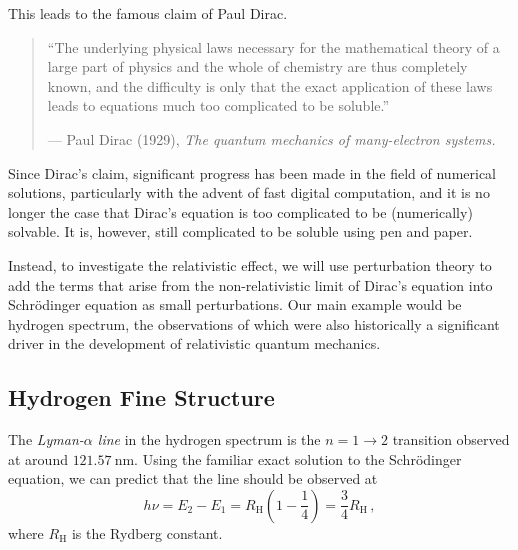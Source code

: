 \documentclass{article}
\theoremstyle{plain}\theoremheaderfont{\normalfont\itshape}\theorembodyfont{\rmfamily}\theoremseparator{.}\newtheorem*{rem}{Remark}\newtheorem*{ex}{Example}\newtheorem*{proof}{Proof}\newtheorem*{altp}{Alternative proof}
\theoremstyle{plain}\theoremheaderfont{\normalfont\bfseries}\theorembodyfont{\rmfamily}\theoremseparator{.}\newtheorem{thm}{Theorem}[section]\newtheorem{lem}[thm]{Lemma}\newtheorem{prop}[thm]{Proposition}\newtheorem*{cor}{Corollary}\newtheorem{defn}[thm]{Definition}\newtheorem{clm}[thm]{Claim}\newtheorem{clminproof}{Claim}
\theoremstyle{break}\theoremheaderfont{\normalfont\itshape}\theorembodyfont{\rmfamily}\theoremseparator{.\medskip}\newtheorem*{proofskip}{Proof}\newtheorem*{exs}{Examples}\newtheorem*{rems}{Remarks}
\theoremstyle{break}\theoremheaderfont{\normalfont\bfseries}\theorembodyfont{\rmfamily}\theoremseparator{.\medskip}\newtheorem{lemskip}[thm]{Lemma}\newtheorem{defnskip}[thm]{Definition}\newtheorem{propskip}[thm]{Proposition}\newtheorem{thmskip}[thm]{Theorem}
\numberwithin{equation}{section}
\newcommand{\unit}[1]{\ \mathrm{#1}}
\begin{document}
    This leads to the famous claim of Paul Dirac.
    \begin{quote}
        ``The underlying physical laws necessary for the mathematical theory of a large part of physics and the whole of chemistry are thus completely known, and the difficulty is only that the exact application of these laws leads to equations much too complicated to be soluble.''

        \hfill --- Paul Dirac (1929), \textit{The quantum mechanics of many-electron systems.}
    \end{quote}

    Since Dirac's claim, significant progress has been made in the field of numerical solutions, particularly with the advent of fast digital computation, and it is no longer the case that Dirac's equation is too complicated to be (numerically) solvable. It is, however, still complicated to be soluble using pen and paper.

    Instead, to investigate the relativistic effect, we will use perturbation theory to add the terms that arise from the non-relativistic limit of Dirac's equation into Schr\"{o}dinger equation as small perturbations. Our main example would be hydrogen spectrum, the observations of which were also historically a significant driver in the development of relativistic quantum mechanics.

    \subsection{Hydrogen Fine Structure}
    The \textit{Lyman-\(\alpha\) line} in the hydrogen spectrum is the \(n=1\to 2\) transition observed at around \(121.57\unit{nm}\). Using the familiar exact solution to the Schr\"{o}dinger equation, we can predict that the line should be observed at
    \begin{equation}
        h\nu=E_2-E_1=R_{\mathrm{H}}\left(1-\frac{1}{4}\right)=\frac{3}{4}R_{\mathrm{H}}\,,
    \end{equation}
    where \(R_{\mathrm{H}}\) is the Rydberg constant.
\end{document}
